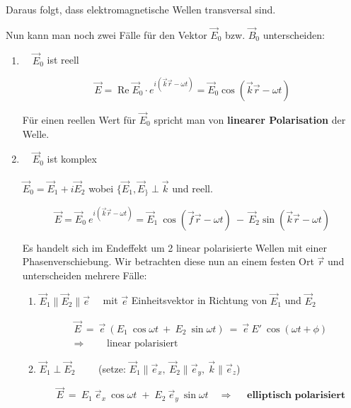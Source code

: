 Daraus folgt, dass elektromagnetische Wellen transversal sind.\

Nun kann man noch zwei Fälle für den Vektor $\vec{E}_0$ bzw. $\vec{B}_0$ unterscheiden:

\begin{enumerate}[label=\textbf{\arabic* .}]
	
	\item $ \quad \vec{E}_0$ ist reell
	
	\begin{equation}
	\vec{E} = \operatorname{Re} \vec{E}_0 \cdot e^{i(\vec{k}\vec{r}-\omega t)} = \vec{E}_0 \cos(\vec{k}\vec{r}-\omega t) 
	\end{equation}
	
	Für einen reellen Wert für $\vec{E}_0$ spricht man von \textbf{linearer Polarisation} der Welle.
	
	\item $\quad \vec{E}_0$ ist komplex\\
	\ \\
	$\vec{E}_0 =\vec{E}_1 + i\vec{E}_2$ wobei $\{\vec{E}_1,\vec{E}_\}\perp\vec{k}$ und reell.
	
	\begin{equation*}
	\vec{E} = \vec{E}_0 \ e^{i(\vec{k}\vec{r}-\omega t)} = \vec{E}_1 \ \cos(\vec{f}\vec{r}-\omega t) \ - \ \vec{E}_2 \sin (\vec{k}\vec{r} - \omega t)
	\end{equation*}
	
	Es handelt sich im Endeffekt um 2 linear polarisierte Wellen mit einer Phasenverschiebung. Wir betrachten diese nun an einem festen Ort $\vec{r}$ und unterscheiden mehrere Fälle:
	
	\begin{enumerate}
		\item $\vec{E}_1\parallel\vec{E}_2\parallel\vec{e} \quad $ mit $\vec{e}$ Einheitsvektor in Richtung von $\vec{E}_1$ und $\vec{E}_2$
		
		\begin{align*}
		\vec{E} \ = \ \vec{e} \ (E_1 \ \cos \omega t \ + \ E_2 \ \sin \omega t) \  = \  \vec{e}  \ E' \ \cos(\omega t + \phi)\\
		\Rightarrow \qquad \text{ linear polarisiert}
		\end{align*}
		
		\item $\vec{E}_1\perp\vec{E}_2 \qquad$ (setze: $\vec{E}_1\parallel\vec{e}_x, \  \vec{E}_2\parallel\vec{e}_y, \  \vec{k}\parallel\vec{e}_z$)
		
		\begin{equation*}
		\vec{E} \ = \ E_1 \ \vec{e}_x \ \cos \omega t \; + \; E_2 \ \vec{e}_y \ \sin\omega t
		\quad\Rightarrow \quad \textbf{ elliptisch polarisiert}
		\end{equation*}
		

\end{enumerate}
\end{enumerate}

